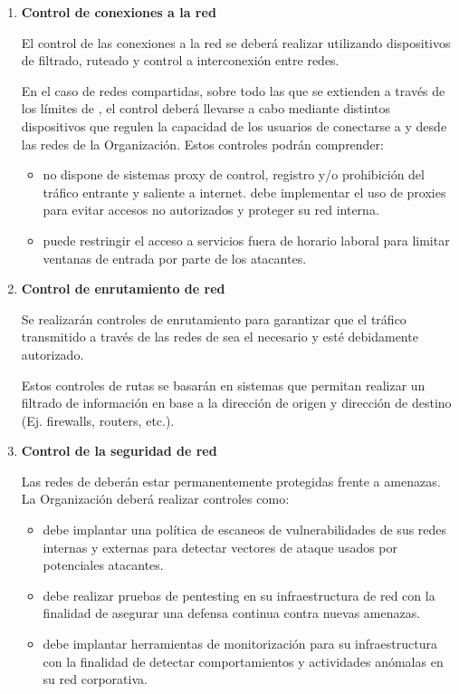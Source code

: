 \begin{enumerate}[label=\alph*)]
    \item \textbf{Control de conexiones a la red}

    El control de las conexiones a la red se deberá realizar utilizando dispositivos de filtrado, ruteado y control a interconexión entre redes.

    En el caso de redes compartidas, sobre todo las que se extienden a través de los límites de \Beneficiario{}, el control deberá llevarse a cabo mediante distintos dispositivos que regulen la capacidad de los usuarios de conectarse a y desde las redes de la Organización. Estos controles podrán comprender:

    \begin{itemize}
        \item \Beneficiario{} no dispone de sistemas proxy de control, registro y/o prohibición del tráfico entrante y saliente a internet. \Beneficiario{} debe implementar el uso de proxies para evitar accesos no autorizados y proteger su red interna.
        \item \Beneficiario{} puede restringir el acceso a servicios fuera de horario laboral para limitar ventanas de entrada por parte de los atacantes.
    \end{itemize}

    \item \textbf{Control de enrutamiento de red}

    Se realizarán controles de enrutamiento para garantizar que el tráfico transmitido a través de las redes de \Beneficiario{} sea el necesario y esté debidamente autorizado.

    Estos controles de rutas se basarán en sistemas que permitan realizar un filtrado de información en base a la dirección de origen y dirección de destino (Ej. firewalls, routers, etc.).

    \item \textbf{Control de la seguridad de red}

    Las redes de \Beneficiario{} deberán estar permanentemente protegidas frente a amenazas. La Organización deberá realizar controles como:

    \begin{itemize}
        \item \Beneficiario{} debe implantar una política de escaneos de vulnerabilidades de sus redes internas y externas para detectar vectores de ataque usados por potenciales atacantes.
        \item \Beneficiario{} debe realizar pruebas de pentesting en su infraestructura de red con la finalidad de asegurar una defensa continua contra nuevas amenazas.
        \item \Beneficiario{} debe implantar herramientas de monitorización para su infraestructura con la finalidad de detectar comportamientos y actividades anómalas en su red corporativa.
    \end{itemize}

\end{enumerate}
